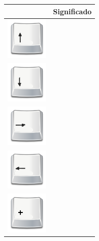 \begin{table}[H]
  \begin{center}
    \begin{tabular}{|p{2cm}|p{10cm}|}
      \hline
      \centering{Tecla} & \qquad \quad Significado \\
      \hline
      \includegraphics[width=2cm]{./imagenes/flecha_arriba.png} & \vspace*{-.8in}{Avanzar. Orden de movimiento frontal, el vehículo se detiene al soltar la tecla.} \\
      \hline
      \includegraphics[width=2cm]{./imagenes/flecha_abajo.png} & \vspace*{-.8in}{Retroceder. Orden de movimiento en retroceso, el vehículo se detiene al soltar la tecla.} \\
      \hline
      \includegraphics[width=2cm]{./imagenes/flecha_derecha.png} & \vspace*{-.8in}{Giro cerrado a la derecha. Orden de giro a la derecha, el vehículo se detiene al soltar la tecla.} \\
      \hline
      \includegraphics[width=2cm]{./imagenes/flecha_izquierda.png} & \vspace*{-.8in}{Giro cerrado a la izquierda. Orden de giro a la izquierda, el vehículo se detiene al soltar la tecla.} \\
      \hline

      \hline
      \includegraphics[width=2cm]{./imagenes/tecla_mas.png} & \vspace*{-.8in}{Incremento de velocidad. Se incrementa en una unidad la velocidad del vehículo.} \\
      \hline


\end{tabular}
\end{center}
\end{table}

